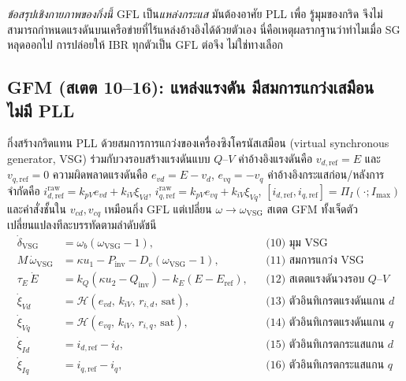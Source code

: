 \documentclass[12pt,a4paper]{article}
\begin{document}
\emph{ข้อสรุปเชิงกายภาพของกิ่งนี้} GFL เป็น\emph{แหล่งกระแส} มันต้องอาศัย PLL เพื่อ
รู้มุมของกริด จึงไม่สามารถกำหนดแรงดันบนเครือข่ายที่ไร้แหล่งอ้างอิงได้ด้วยตัวเอง
นี่คือเหตุผลรากฐานว่าทำไมเมื่อ SG หลุดออกไป การปล่อยให้ IBR ทุกตัวเป็น GFL ต่อจึง
ไม่ใช่ทางเลือก

\subsection{ GFM (สเตต 10--16): แหล่งแรงดัน มีสมการแกว่งเสมือน ไม่มี PLL}
กิ่งสร้างกริดแทน PLL ด้วยสมการการแกว่งของเครื่องซิงโครนัสเสมือน (virtual
synchronous generator, VSG) ร่วมกับวงรอบสร้างแรงดันแบบ $Q$--$V$ ค่าอ้างอิงแรงดันคือ
$v_{d,\mathrm{ref}}=E$ และ $v_{q,\mathrm{ref}}=0$ ความผิดพลาดแรงดันคือ
$e_{vd}=E-v_d$, $e_{vq}=-v_q$ ค่าอ้างอิงกระแสก่อน/หลังการจำกัดคือ
$i_{d,\mathrm{ref}}^{\mathrm{raw}}=k_{pV}e_{vd}+k_{iV}\xi_{Vd}$,
$i_{q,\mathrm{ref}}^{\mathrm{raw}}=k_{pV}e_{vq}+k_{iV}\xi_{Vq}$,
$[i_{d,\mathrm{ref}},i_{q,\mathrm{ref}}]=\Pi_I(\cdot;I_{\max})$ และคำสั่งชั้นใน
$v_{cd},v_{cq}$ เหมือนกิ่ง GFL แต่เปลี่ยน $\omega\to\omega_{\mathrm{VSG}}$
สเตต GFM ทั้งเจ็ดตัวเปลี่ยนแปลงทีละบรรทัดตามลำดับดัชนี
\begin{align}
  \dot{\delta}_{\mathrm{VSG}} &= \omega_b(\omega_{\mathrm{VSG}}-1), &&\text{(10) มุม VSG}\\
  M\,\dot{\omega}_{\mathrm{VSG}} &= \kappa u_1-P_{\mathrm{inv}}-D_v(\omega_{\mathrm{VSG}}-1),
     &&\text{(11) สมการแกว่ง VSG}\\
  \tau_E\,\dot{E} &= k_Q(\kappa u_2-Q_{\mathrm{inv}})-k_E(E-E_{\mathrm{ref}}),
     &&\text{(12) สเตตแรงดันวงรอบ $Q$--$V$}\\
  \dot{\xi}_{Vd} &= \mathcal{H}(e_{vd},\,k_{iV},\,r_{i,d},\,\text{sat}),
     &&\text{(13) ตัวอินทิเกรตแรงดันแกน $d$}\\
  \dot{\xi}_{Vq} &= \mathcal{H}(e_{vq},\,k_{iV},\,r_{i,q},\,\text{sat}),
     &&\text{(14) ตัวอินทิเกรตแรงดันแกน $q$}\\
  \dot{\xi}_{Id} &= i_{d,\mathrm{ref}}-i_d, &&\text{(15) ตัวอินทิเกรตกระแสแกน $d$}\\
  \dot{\xi}_{Iq} &= i_{q,\mathrm{ref}}-i_q, &&\text{(16) ตัวอินทิเกรตกระแสแกน $q$}
\end{align}
\end{document}
